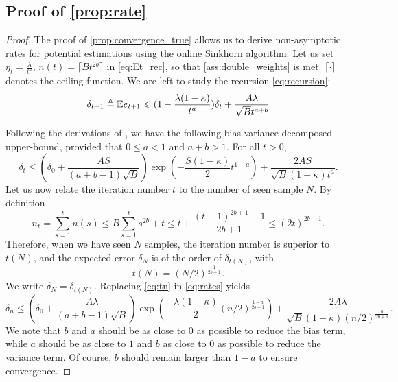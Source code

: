\subsection{Proof of \autoref{prop:rate}}\label{app:proof_rate}

\begin{proof}
The proof of \autoref{prop:convergence_true} allows us to derive non-asymptotic rates for potential estimations using the online Sinkhorn algorithm. Let us set $\eta_t = \frac{\lambda}{t^a}$, $n(t) = \lceil B t^{2b} \rceil$ in \eqref{eq:Et_rec}, so that \autoref{ass:double_weights} is met.
$\lceil \cdot \rceil$ denotes the ceiling function.
We are left to study the recursion \eqref{eq:recursion}:
\begin{equation}
    \delta_{t+1} \triangleq \mathbb{E} e_{t+1} \leqslant (1 - \frac{\lambda(1 - \kappa)}{t^a}) \delta_t + 
    \frac{A \lambda}{\sqrt{B}{t^{a + b}}}
\end{equation}

Following the derivations of \citet[Theorem 2]{moulines_non-asymptotic_2011}, we have the following
bias-variance decomposed upper-bound,
provided that $0 \leq a < 1$ and $a+ b > 1$. For all $t > 0$,
\begin{equation}\label{eq:rates}
    \delta_t \leq (\delta_0 + \frac{A S}{(a + b - 1)\sqrt{B}})
    \exp(- \frac{S(1 - \kappa)}{2} t^{1 - a})
    + \frac{2 A S}{\sqrt{B}(1 - \kappa) t^a}.
\end{equation}
Let us now relate the iteration number $t$ to the number of seen sample $N$. By definition
\begin{equation}
    n_t = \sum_{s=1}^t n(s) \leq B \sum_{s=1}^t s^{2b} + t \leq
     t + \frac{(t+1)^{2b + 1} - 1}{2b + 1}
     \leq (2t)^{2b+1}.
\end{equation}
Therefore, when we have seen $N$ samples, the iteration number is superior to $t(N)$, and the expected error $\delta_N$ is of the order of $\delta_{t(N)}$, with
\begin{equation}\label{eq:tn}
    t(N) =  {(N/2)}^{\frac{1}{2b + 1}}.
\end{equation}
We write $\delta_N = \delta_{t(N)}$. Replacing \eqref{eq:tn} in \eqref{eq:rates} yields
\begin{equation}\label{eq:non-asymptotic}
    \delta_n \leq 
    (\delta_0 + \frac{A \lambda}{(a + b - 1)\sqrt{B}})
    \exp\left(- \frac{\lambda(1 - \kappa)}{2} {(n /2)}^{\frac{1 - a}{2b+1}}\right)
    + \frac{2 A \lambda}{\sqrt{B}(1 - \kappa) {(n/2)}^{\frac{a}{2b+1}}}.
\end{equation}
We note that $b$ and $a$ should be as close to $0$ as possible to reduce the bias term, while $a$
should be as close to $1$ and $b$ as close to $0$ as possible to reduce the variance
term. Of course, $b$ should remain larger than $1 - a$ to ensure convergence.


\end{proof}
